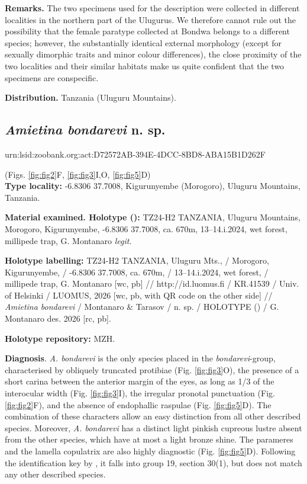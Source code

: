 \documentclass[fleqn,10pt,lineno]{wlpeerj}
\begin{document}
\textbf{Remarks.} The two specimens used for the description were collected in different localities in the northern part of the Ulugurus. We therefore cannot rule out the possibility that the female paratype collected at Bondwa belongs to a different species; however, the substantially identical external morphology (except for sexually dimorphic traits and minor colour differences), the close proximity of the two localities and their similar habitats make us quite confident that the two specimens are conspecific.

\textbf{Distribution.} Tanzania (Uluguru Mountains).

 

\subsection*{\textbf{\textit{Amietina bondarevi} n. sp.}}

urn:lsid:zoobank.org:act:D72572AB-394E-4DCC-8BD8-ABA15B1D262F

(Figs. \ref{fig:fig2}F, \ref{fig:fig3}I,O, \ref{fig:fig5}D)\\

\textbf{Type locality:} -6.8306 37.7008, Kigurunyembe (Morogoro), Uluguru Mountains, Tanzania.

\textbf{Material examined. Holotype (\male):} TZ24-H2 TANZANIA, Uluguru Mountains, Morogoro, Kigurunyembe, -6.8306 37.7008, ca. 670m, 13–14.i.2024, wet forest, millipede trap, G. Montanaro \textit{legit}.

\textbf{Holotype labelling:} TZ24-H2 TANZANIA, Uluguru Mts., / Morogoro, Kigurunyembe, / -6.8306 37.7008, ca. 670m, / 13–14.i.2024, wet forest, / millipede trap, G. Montanaro [wc, pb] // http://id.luomus.fi / KR.41539 / Univ. of Helsinki / LUOMUS, 2026 [wc, pb, with QR code on the other side] // \textit{Amietina bondarevi} / Montanaro \& Tarasov / n. sp. / HOLOTYPE (\male) / G. Montanaro des. 2026 [rc, pb].

\textbf{Holotype repository:} MZH.

\textbf{Diagnosis}. \textit{A. bondarevi} is the only species placed in the \textit{bondarevi}-group, characterised by obliquely truncated protibiae (Fig. \ref{fig:fig3}O), the presence of a short carina between the anterior margin of the eyes, as long as 1/3 of the interocular width (Fig. \ref{fig:fig3}I), the irregular pronotal punctuation (Fig. \ref{fig:fig2}F), and the absence of endophallic raspulae (Fig. \ref{fig:fig5}D). The combination of these characters allow an easy distinction from all other described species. Moreover, \textit{A. bondarevi} has a distinct light pinkish cupreous lustre absent from the other species, which have at most a light bronze shine. The parameres and the lamella copulatrix are also highly diagnostic (Fig. \ref{fig:fig5}D). Following the identification key by \cite{orbigny1913synopsis}, it falls into group 19, section 30(1), but does not match any other described species.
\end{document}
